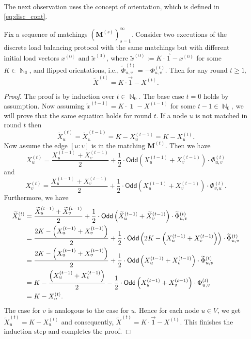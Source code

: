 \documentclass[twoside,leqno]{article}
\newcommand{\Odd}{\mathsf{Odd}}
\DeclareMathOperator{\N}{\mathbb{N}}
\newcommand{\M}{\mathbf{M}}
\DeclareMathOperator{\1}{\mathbf{1}}
\numberwithin{equation}{section}
\begin{document}
The next observation uses the concept of orientation, which is defined in \cref{eq:disc_cont}.
\begin{observation}\label{obs:flip}
Fix a sequence of matchings $\left(\M^{(s)}\right)_{s=1}^{\infty}$. Consider two executions of the discrete load balancing protocol with the same matchings but with different initial load vectors $x^{(0)}$ and $\widetilde{x}^{(0)}$, where $\widetilde{x}^{(0)}:=K\cdot \vec{ 1} -x^{(0)}$ for some $K \in \N_0$, and flipped orientations, i.e., $\widetilde{\Phi}_{u,v}^{(t)}=-\Phi_{u,v}^{(t)}$. Then for any round $t \geq 1$,
\[
\widetilde{X}^{(t)} = K\cdot \vec{1} -X^{(t)}.
\]
\end{observation}
\begin{proof}
The proof is by induction over $t \in \N_0$. The base case $t=0$ holds by assumption. Now assuming $\widetilde{x}^{(t-1)}= K\cdot\1-X^{(t-1)}$ for some $t-1 \in \N_0$, we will prove that the same equation holds for round $t$. If a node $u$ is not matched in round $t$ then \[\widetilde{X}_u^{(t)}= \widetilde{X}_u^{(t-1)} = K-X_u^{(t-1)} = K-X_u^{(t)}.\]
Now assume the edge $[u:v]$ is in the matching $\M^{(t)}$. 
Then we have
\[
X_u^{(t)} = \frac{X_u^{(t-1)}+X_v^{(t-1)}}{2} + \frac{1}{2}\cdot \Odd\left(X_u^{(t-1)}+X_v^{(t-1)}\right)\cdot \Phi_{u,v}^{(t)}
\]
and
\[
X_v^{(t)} = \frac{X_u^{(t-1)}+X_v^{(t-1)}}{2} + \frac{1}{2}\cdot \Odd\left(X_u^{(t-1)}+X_v^{(t-1)}\right)\cdot \Phi_{v,u}^{(t)}.
\]
Furthermore, we have
\begin{align}
\widetilde{X}_u^{(t)} &= \frac{\widetilde{X}_u^{(t-1)} + \widetilde{X}_v^{(t-1)}}{2} + \frac{1}{2}\cdot \Odd\left(\widetilde{X}_u^{(t-1)} + \widetilde{X}_v^{(t-1)}\right)\cdot \widetilde{\Phi}_{u,v}^{(t)}\notag \\
& =
\frac{2K-\left(X_u^{(t-1)}+X_v^{(t-1)}\right)}{2} + \frac{1}{2} \cdot \Odd\left( 2K- \left(X_u^{(t-1)}+X_v^{(t-1)}\right)\right) \cdot \widetilde{\Phi}_{u,v}^{(t)}\notag\\
& = \frac{2K-\left(X_u^{(t-1)}+X_v^{(t-1)}\right)}{2} + \frac{1}{2} \cdot \Odd\left( X_u^{(t-1)}+X_v^{(t-1)}\right) \cdot \widetilde{\Phi}_{u,v}^{(t)}\notag\\
& = K - \frac{\left(X_u^{(t-1)}+X_v^{(t-1)}\right)}{2} - \frac{1}{2} \cdot \Odd\left(X_u^{(t-1)}+X_v^{(t-1)}\right) \cdot \Phi_{u,v}^{(t)}\notag\\
&= K-X_u^{(t)}.\notag
\end{align}
The case for $v$ is analogous to the case for $u$. Hence for each node $u\in V$, we get $\widetilde{X}_u^{(t)}=K-X_u^{(t)}$ and consequently, $\widetilde{X}^{(t)}=K\cdot \vec{ 1} -X^{(t)}$. 
This finishes the induction step and completes the proof.
\end{proof}
\end{document}
